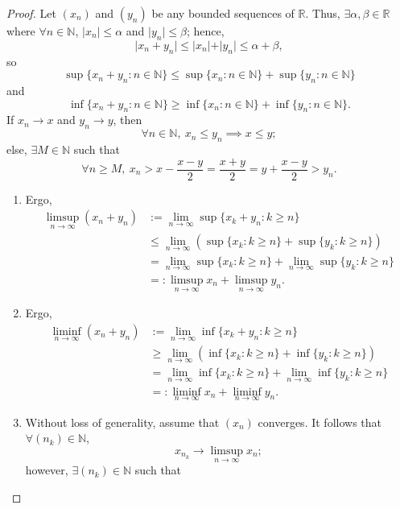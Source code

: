 \documentclass{amsart}
\theoremstyle{definition}
\begin{document}
\begin{proof}
    Let $(x_n)$ and $(y_n)$ be any bounded sequences of $\mathbb{R}$. Thus, $\exists \alpha,\beta \in \mathbb{R}$ where $\forall n \in \mathbb{N}$, $\vert x_n \vert \leq \alpha$ and $\vert y_n \vert \leq \beta$; hence,
    \[
    \vert x_n + y_n \vert \leq \vert x_n \vert + \vert y_n \vert \leq \alpha + \beta,
    \]
    so
    \[
    \sup \{x_n + y_n : n \in \mathbb{N}\} \leq \sup \{x_n : n \in \mathbb{N}\} + \sup \{y_n : n \in \mathbb{N}\} 
    \]
    and 
    \[
    \inf \{x_n + y_n : n \in \mathbb{N}\} \geq \inf \{x_n : n \in \mathbb{N}\} + \inf \{y_n : n \in \mathbb{N}\}.
    \]
    If $x_n \to x$ and $y_n \to y$, then 
    \[
    \forall n \in \mathbb{N}, \ x_n \leq y_n \implies x \leq y;
    \]
    else, $\exists M \in \mathbb{N}$ such that 
    \[
    \forall n \geq M, \ x_n > x - \frac{x-y}{2} = \frac{x+y}{2} = y + \frac{x-y}{2} > y_n.
    \]
    \begin{enumerate}[label = (\alph*)]
        \item Ergo,
        \begin{align*}
            \limsup_{n \to \infty}(x_n + y_n) &:= \lim_{n \to \infty} \sup \{x_k + y_n : k \geq n\} \\
            &\leq \lim_{n \to \infty} (\sup \{x_k : k \geq n\} + \sup \{y_k : k \geq n\}) \\
            &= \lim_{n \to \infty} \sup \{x_k : k \geq n\} + \lim_{n \to \infty} \sup \{y_k : k \geq n\} \\
            &=: \limsup_{n \to \infty}x_n + \limsup_{n \to \infty}y_n.
        \end{align*}
        \item Ergo,
        \begin{align*}
            \liminf_{n \to \infty}(x_n + y_n) &:= \lim_{n \to \infty} \inf \{x_k + y_n : k \geq n\} \\
            &\geq \lim_{n \to \infty} (\inf \{x_k : k \geq n\} + \inf \{y_k : k \geq n\}) \\
            &= \lim_{n \to \infty} \inf \{x_k : k \geq n\} + \lim_{n \to \infty} \inf \{y_k : k \geq n\} \\
            &=: \liminf_{n \to \infty}x_n + \liminf_{n \to \infty}y_n.
        \end{align*}
        \item Without loss of generality, assume that $(x_n)$ converges. It follows that $\forall (n_k) \in \mathbb{N}$,
        \[
        x_{n_k} \to \limsup_{n \to \infty}x_n;
        \]
        however, $\exists (n_k) \in \mathbb{N}$ such that 

\end{enumerate}
\end{proof}
\end{document}
